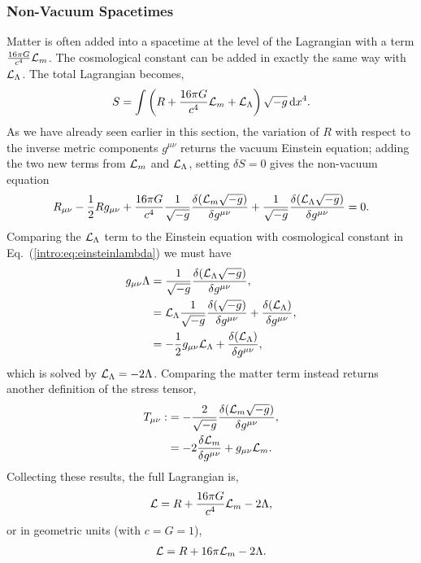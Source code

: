 \subsubsection*{Non-Vacuum Spacetimes}
Matter is often added into a spacetime at the level of the Lagrangian with a term $\frac{16 \pi G}{c^4}\mathcal{L}_m$. The cosmological constant can be added in exactly the same way with $\mathcal{L}_\Lambda$. The total Lagrangian becomes,
\begin{equation}
S = \int \left({R} + \frac{16 \pi G}{c^4} \mathcal{L}_m + \mathcal{L}_\Lambda \right)\sqrt{-g} \,\dd x^4.
\end{equation}
As we have already seen earlier in this section, the variation of $R$ with respect to the inverse metric components $g^{\mu\nu}$ returns the vacuum Einstein equation; adding the two new terms from $\mathcal{L}_m$ and $\mathcal{L}_\Lambda$, setting $\delta S =0$ gives the non-vacuum equation
\begin{equation}
R_{\mu\nu} - \frac{1}{2}Rg_{\mu\nu} + \frac{16 \pi G}{c^4}\frac{1}{\sqrt{-g}}\frac{\delta( \mathcal{L}_m \sqrt{-g})}{\delta g^{\mu\nu}} + \frac{1}{\sqrt{-g}}\frac{\delta (\mathcal{L}_\Lambda \sqrt{-g})}{\delta g^{\mu\nu}} = 0.
\end{equation}
Comparing the $\mathcal{L}_\Lambda$ term to the Einstein equation with cosmological constant in Eq.~(\ref{intro:eq:einsteinlambda}) we must have
\begin{align}
g_{\mu\nu} \Lambda &= \frac{1}{\sqrt{-g}}\frac{\delta (\mathcal{L}_\Lambda \sqrt{-g})}{\delta g^{\mu\nu}} , \\
&= \mathcal{L}_\Lambda \frac{1}{\sqrt{-g}}\frac{\delta ( \sqrt{-g})}{\delta g^{\mu\nu}} + \frac{\delta (\mathcal{L}_\Lambda )}{\delta g^{\mu\nu}}, \\
&=-\frac{1}{2}g_{\mu\nu}\mathcal{L}_\Lambda  + \frac{\delta (\mathcal{L}_\Lambda )}{\delta g^{\mu\nu}}, \\
\end{align}
which is solved by $\mathcal{L}_\Lambda = -2\Lambda$. Comparing the matter term instead returns another definition of the stress tensor,
\begin{align}
T_{\mu\nu}:&=-\frac{2}{\sqrt{-g}}\frac{\delta (\mathcal{L}_m \sqrt{-g})}{\delta g^{\mu\nu}},\\
&= -2\frac{\delta \mathcal{L}_m}{\delta g^{\mu\nu}} + g_{\mu\nu} \mathcal{L}_m .\label{intro:eq:Tdef}
\end{align} 
Collecting these results, the full Lagrangian is,
\begin{align}
\mathcal{L} = R + \frac{16 \pi G}{c^4} \mathcal{L}_m -2\Lambda,
\end{align}
or in geometric units (with $c=G=1$),
\begin{align}
\mathcal{L} = R + 16 \pi \mathcal{L}_m -2\Lambda.
\end{align}
